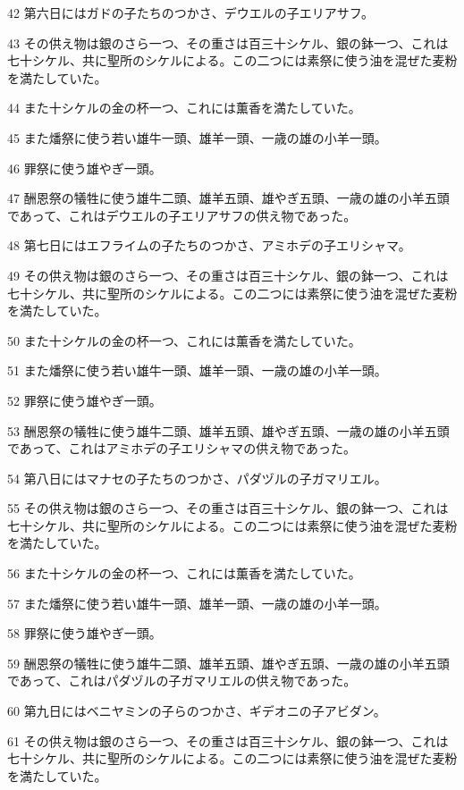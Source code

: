 \par 42 第六日にはガドの子たちのつかさ、デウエルの子エリアサフ。
\par 43 その供え物は銀のさら一つ、その重さは百三十シケル、銀の鉢一つ、これは七十シケル、共に聖所のシケルによる。この二つには素祭に使う油を混ぜた麦粉を満たしていた。
\par 44 また十シケルの金の杯一つ、これには薫香を満たしていた。
\par 45 また燔祭に使う若い雄牛一頭、雄羊一頭、一歳の雄の小羊一頭。
\par 46 罪祭に使う雄やぎ一頭。
\par 47 酬恩祭の犠牲に使う雄牛二頭、雄羊五頭、雄やぎ五頭、一歳の雄の小羊五頭であって、これはデウエルの子エリアサフの供え物であった。
\par 48 第七日にはエフライムの子たちのつかさ、アミホデの子エリシャマ。
\par 49 その供え物は銀のさら一つ、その重さは百三十シケル、銀の鉢一つ、これは七十シケル、共に聖所のシケルによる。この二つには素祭に使う油を混ぜた麦粉を満たしていた。
\par 50 また十シケルの金の杯一つ、これには薫香を満たしていた。
\par 51 また燔祭に使う若い雄牛一頭、雄羊一頭、一歳の雄の小羊一頭。
\par 52 罪祭に使う雄やぎ一頭。
\par 53 酬恩祭の犠牲に使う雄牛二頭、雄羊五頭、雄やぎ五頭、一歳の雄の小羊五頭であって、これはアミホデの子エリシャマの供え物であった。
\par 54 第八日にはマナセの子たちのつかさ、パダヅルの子ガマリエル。
\par 55 その供え物は銀のさら一つ、その重さは百三十シケル、銀の鉢一つ、これは七十シケル、共に聖所のシケルによる。この二つには素祭に使う油を混ぜた麦粉を満たしていた。
\par 56 また十シケルの金の杯一つ、これには薫香を満たしていた。
\par 57 また燔祭に使う若い雄牛一頭、雄羊一頭、一歳の雄の小羊一頭。
\par 58 罪祭に使う雄やぎ一頭。
\par 59 酬恩祭の犠牲に使う雄牛二頭、雄羊五頭、雄やぎ五頭、一歳の雄の小羊五頭であって、これはパダヅルの子ガマリエルの供え物であった。
\par 60 第九日にはベニヤミンの子らのつかさ、ギデオニの子アビダン。
\par 61 その供え物は銀のさら一つ、その重さは百三十シケル、銀の鉢一つ、これは七十シケル、共に聖所のシケルによる。この二つには素祭に使う油を混ぜた麦粉を満たしていた。
